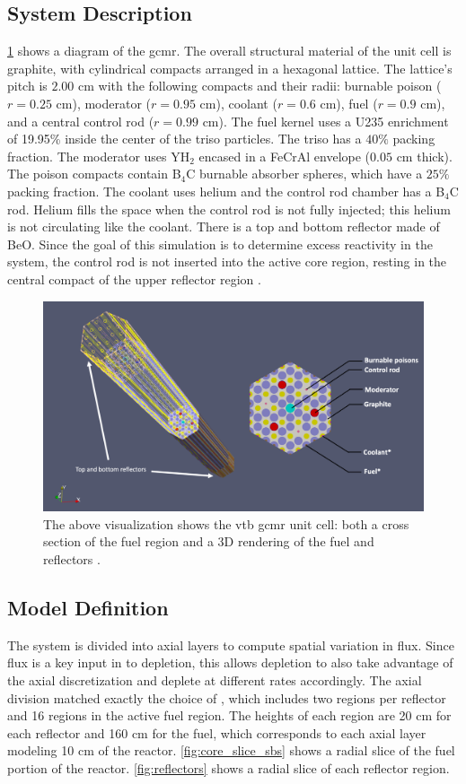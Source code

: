 \documentclass[letterpaper]{physor2024}
\begin{document}
\subsection{System Description}\label{sec:system}
 \cref{fig:vtb_gcmr} shows a diagram of the \gls{gcmr}. The overall structural material of the unit cell is graphite, with cylindrical compacts arranged in a hexagonal lattice. The lattice's pitch is $2.00$ cm with the following compacts and their radii: burnable poison ($r=0.25$ cm), moderator ($r=0.95$ cm), coolant ($r=0.6$ cm), fuel ($r=0.9$ cm), and a central control rod ($r=0.99$ cm). The fuel kernel uses a U235 enrichment of 19.95\% inside the center of the \gls{triso} particles. The \gls{triso} has a $40\%$ packing fraction. The moderator uses YH$_{2}$ encased in a FeCrAl envelope ($0.05$ cm thick). The poison compacts contain B$_{4}$C burnable absorber spheres, which have a $25\%$ packing fraction. The coolant uses helium and the control rod chamber has a B$_{4}$C rod. Helium fills the space when the control rod is not fully injected; this helium is not circulating like the coolant. There is a top and bottom reflector made of BeO. Since the goal of this simulation is to determine excess reactivity in the system, the control rod is not inserted into the active core region, resting in the central compact of the upper reflector region \cite{Abdelhameed-ANS-2022}.
\begin{figure}[h!]
    \centering
    \includegraphics[width=0.8\linewidth]{figures/vtb_gcmr_diagram.jpg}
    \caption{The above visualization shows the \gls{vtb} \gls{gcmr} unit cell: both a cross section of the fuel region and a 3D rendering of the fuel and reflectors \cite{Stauff-applications-2022}.}
    \label{fig:vtb_gcmr}
\end{figure}

\subsection{Model Definition}\label{sec:model_def}
The system is divided into axial layers to compute spatial variation in flux. Since flux is a key input in to depletion, this allows depletion to also take advantage of the axial discretization and deplete at different rates accordingly. The axial division matched exactly the choice of \cite{Abdelhameed-ANS-2022}, which includes two regions per reflector and 16 regions in the active fuel region. The heights of each region are 20 cm for each reflector and 160 cm for the fuel, which corresponds to each axial layer modeling 10 cm of the reactor. \cref{fig:core_slice_sbs} shows a radial slice of the fuel portion of the reactor. \cref{fig:reflectors} shows a radial slice of each reflector region.
\end{document}
